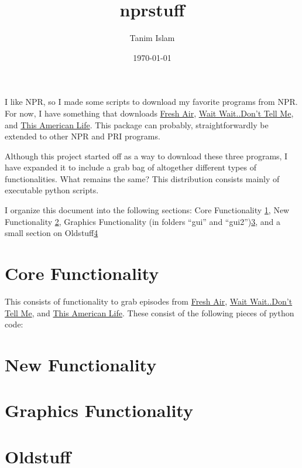\documentclass[]{article}
\title{nprstuff}
\date{\today}
\author{Tanim Islam}
\begin{document}
\maketitle

I like NPR, so I made some scripts to download my favorite programs from
NPR. For now, I have something that downloads
\href{http://www.npr.org/programs/fresh-air/}{Fresh Air},
\href{http://www.npr.org/programs/wait-wait-dont-tell-me/}{Wait
Wait..Don't Tell Me}, and \href{http://www.thisamericanlife.org/}{This
American Life}. This package can probably, straightforwardly be
extended to other NPR and PRI programs.

Although this project started off as a way to download these three
programs, I have expanded it to include a grab bag of altogether
different types of functionalities. What remains the same? This
distribution consists mainly of executable python scripts.

I organize this document into the following sections: Core
Functionality \ref{sec:core_functionality}, New Functionality
\ref{sec:new_functionality}, Graphics Functionality (in folders
``gui'' and ``gui2'')\ref{sec:graphics_functionality}, and a small
section on Oldstuff\ref{sec:oldstuff}

\section{Core Functionality} \label{sec:core_functionality}
This consists of functionality to grab episodes from
\href{http://www.npr.org/programs/fresh-air/}{Fresh Air}, 
\href{http://www.npr.org/programs/wait-wait-dont-tell-me/}{Wait
Wait..Don't Tell Me}, and \href{http://www.thisamericanlife.org/}{This
American Life}. These consist of the following pieces of python code:

\section{New Functionality} \label{sec:new_functionality}

\section{Graphics Functionality} \label{sec:graphics_functionality}

\section{Oldstuff} \label{sec:oldstuff}
\end{document}
